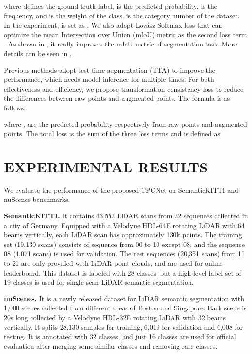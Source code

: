 \documentclass[letterpaper, 10 pt, conference]{ieeeconf}
\begin{document}
where  defines the ground-truth label,  is the predicted probability,  is the frequency, and  is the weight of the  class.  is the category number of the dataset. In the experiment,  is set as . We also adopt Lov{\'a}sz-Softmax loss \cite{berman2018lovasz} that can optimize the mean Intersection over Union (mIoU) metric as the second loss term . As shown in \cite{aksoy2020salsanet, razani2021lite}, it really improves the mIoU metric of segmentation task. More details can be seen in \cite{berman2018lovasz}.

Previous methods \cite{tang2020searching, zhu2021cylindrical} adopt test time augmentation (TTA) to improve the performance, which needs model inference for multiple times. For both effectiveness and efficiency, we propose transformation consistency loss  to reduce the differences between raw points and augmented points. The formula is as follows:

where ,  are the predicted probability respectively from raw points and augmented points. The total loss  is the sum of the three loss terms and is defined as


\section{EXPERIMENTAL RESULTS}
We evaluate the performance of the proposed CPGNet on SemanticKITTI \cite{behley2019semantickitti} and nuScenes \cite{caesar2020nuscenes} benchmarks.

{\bf SemanticKITTI.} It contains 43,552  LiDAR scans from 22 sequences collected in a city of Germany. Equipped with a Velodyne HDL-64E rotating LiDAR with 64 beams vertically, each LiDAR scan has approximately 130k points. The training set (19,130 scans) consists of sequence from 00 to 10 except 08, and the sequence 08 (4,071 scans) is used for validation. The rest sequences (20,351 scans) from 11 to 21 are only provided with LiDAR point clouds, and are used for online leaderboard. This dataset is labeled with 28 classes, but a high-level label set of 19 classes is used for single-scan LiDAR semantic segmentation.

{\bf nuScenes.} It is a newly released dataset for LiDAR semantic segmentation with 1,000 scenes collected from different areas of Boston and Singapore. Each scene is 20s long collected by a Velodyne HDL-32E rotating LiDAR with 32 beams vertically. It splits 28,130 samples for training, 6,019 for validation and 6,008 for testing. It is annotated with 32 classes, and just 16 classes are used for official evaluation after merging some similar classes and removing rare classes.
\end{document}
